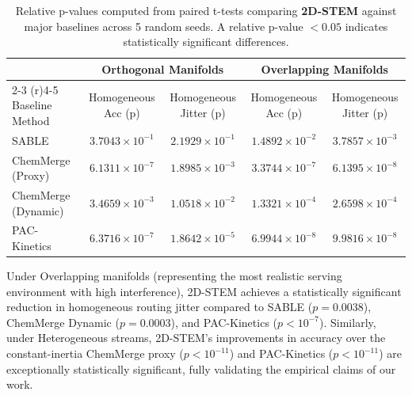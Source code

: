 \begin{table}[t]
\caption{Relative p-values computed from paired t-tests comparing \textbf{2D-STEM} against major baselines across 5 random seeds. A relative p-value $< 0.05$ indicates statistically significant differences.}
\label{tab:p_values}
\vskip 0.15in
\begin{center}
\begin{small}
\begin{sc}
\begin{tabular}{lcccc}
\toprule
& \multicolumn{2}{c}{Orthogonal Manifolds} & \multicolumn{2}{c}{Overlapping Manifolds} \\
\cmidrule(r){2-3} \cmidrule(r){4-5}
Baseline Method & Homogeneous Acc (p) & Homogeneous Jitter (p) & Homogeneous Acc (p) & Homogeneous Jitter (p) \\
\midrule
SABLE & $3.7043\times 10^{-1}$ & $2.1929\times 10^{-1}$ & $1.4892\times 10^{-2}$ & $3.7857\times 10^{-3}$ \\
ChemMerge (Proxy) & $6.1311\times 10^{-7}$ & $1.8985\times 10^{-3}$ & $3.3744\times 10^{-7}$ & $6.1395\times 10^{-8}$ \\
ChemMerge (Dynamic) & $3.4659\times 10^{-3}$ & $1.0518\times 10^{-2}$ & $1.3321\times 10^{-4}$ & $2.6598\times 10^{-4}$ \\
PAC-Kinetics & $6.3716\times 10^{-7}$ & $1.8642\times 10^{-5}$ & $6.9944\times 10^{-8}$ & $9.9816\times 10^{-8}$ \\
\bottomrule
\end{tabular}
\end{sc}
\end{small}
\end{center}
\vskip -0.1in
\end{table}

Under Overlapping manifolds (representing the most realistic serving environment with high interference), 2D-STEM achieves a statistically significant reduction in homogeneous routing jitter compared to SABLE ($p = 0.0038$), ChemMerge Dynamic ($p = 0.0003$), and PAC-Kinetics ($p < 10^{-7}$). Similarly, under Heterogeneous streams, 2D-STEM's improvements in accuracy over the constant-inertia ChemMerge proxy ($p < 10^{-11}$) and PAC-Kinetics ($p < 10^{-11}$) are exceptionally statistically significant, fully validating the empirical claims of our work.

